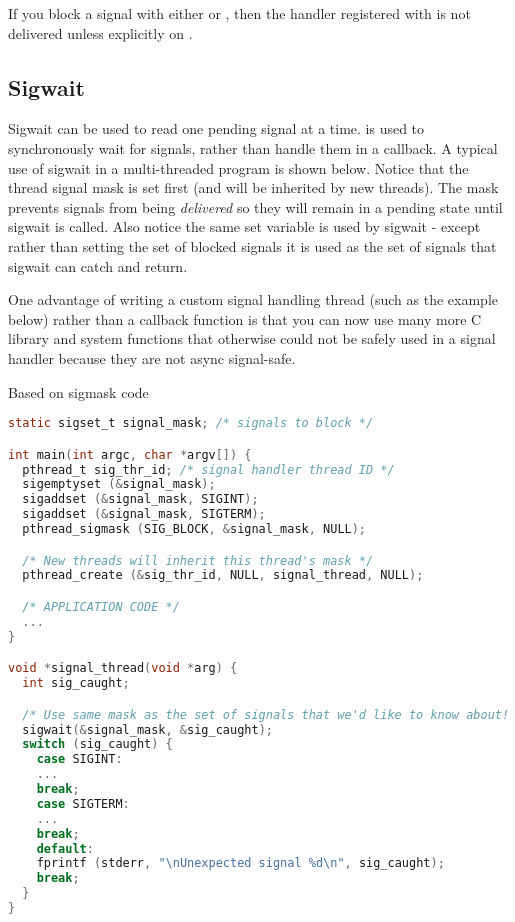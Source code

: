 If you block a signal with either  or , then the handler registered with  is not delivered unless explicitly  on .

\subsection{Sigwait}

Sigwait can be used to read one pending signal at a time.
 is used to synchronously wait for signals, rather than handle them in a callback.
A typical use of sigwait in a multi-threaded program is shown below.
Notice that the thread signal mask is set first (and will be inherited by new threads).
The mask prevents signals from being \emph{delivered} so they will remain in a pending state until sigwait is called.
Also notice the same set  variable is used by sigwait - except rather than setting the set of blocked signals it is used as the set of signals that sigwait can catch and return.

One advantage of writing a custom signal handling thread (such as the example below) rather than a callback function is that you can now use many more C library and system functions that otherwise could not be safely used in a signal handler because they are not async signal-safe.

Based on sigmask code \cite{pthread_sigmask}

\begin{lstlisting}[language=C]
static sigset_t signal_mask; /* signals to block */

int main(int argc, char *argv[]) {
  pthread_t sig_thr_id; /* signal handler thread ID */
  sigemptyset (&signal_mask);
  sigaddset (&signal_mask, SIGINT);
  sigaddset (&signal_mask, SIGTERM);
  pthread_sigmask (SIG_BLOCK, &signal_mask, NULL);

  /* New threads will inherit this thread's mask */
  pthread_create (&sig_thr_id, NULL, signal_thread, NULL);

  /* APPLICATION CODE */
  ...
}

void *signal_thread(void *arg) {
  int sig_caught;

  /* Use same mask as the set of signals that we'd like to know about! */
  sigwait(&signal_mask, &sig_caught);
  switch (sig_caught) {
    case SIGINT:
    ...
    break;
    case SIGTERM:
    ...
    break;
    default:
    fprintf (stderr, "\nUnexpected signal %d\n", sig_caught);
    break;
  }
}
\end{lstlisting}

